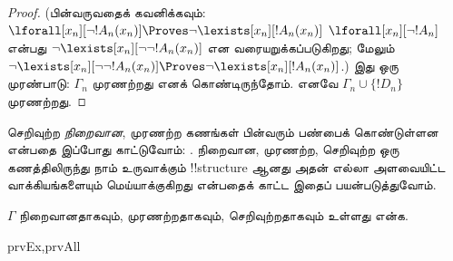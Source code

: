 \documentclass[../../../include/open-logic-section]{subfiles}
\begin{document}
\begin{proof}
{(பின்வருவதைக் கவனிக்கவும்:
{$\lforall[x_n][\lnot !A_n(x_n)] \Proves
  \lnot\lexists[x_n][!A_n(x_n)]$}
{$\lforall[x_n][\lnot !A_n]$ என்பது
  $\lnot\lexists[x_n][\lnot\lnot !A_n(x_n)]$ என வரையறுக்கப்படுகிறது; மேலும்
  $\lnot\lexists[x_n][\lnot\lnot !A_n(x_n)] \Proves
  \lnot\lexists[x_n][!A_n(x_n)]$}.)}{}
இது ஒரு முரண்பாடு: $\Gamma_n$ முரணற்றது எனக் கொண்டிருந்தோம். எனவே
$\Gamma_n \cup \{ !D_n\}$ முரணற்றது.
\end{proof}

\begin{explain}
செறிவுற்ற \emph{நிறைவான}, முரணற்ற கணங்கள் பின்வரும் பண்பைக் கொண்டுள்ளன
என்பதை இப்போது காட்டுவோம்: . நிறைவான, முரணற்ற, செறிவுற்ற ஒரு
கணத்திலிருந்து நாம் உருவாக்கும் !!{structure} ஆனது அதன் எல்லா அளவையிட்ட
வாக்கியங்களையும் மெய்யாக்குகிறது என்பதைக் காட்ட இதைப் பயன்படுத்துவோம்.
\end{explain}

\begin{prop}
$\Gamma$ நிறைவானதாகவும், முரணற்றதாகவும், செறிவுற்றதாகவும் உள்ளது என்க.
\begin{tagenumerate}{prvEx,prvAll}
\end{tagenumerate}
\end{prop}
\end{document}
